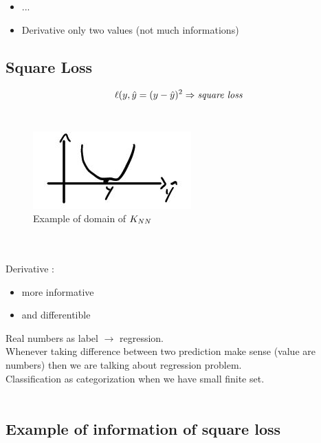 \documentclass[../main.tex]{subfiles}
\begin{document}
\begin{itemize}
\item ...
\item Derivative only two values (not much informations)
\end{itemize}

\subsection{Square Loss}
$$ \ell(y,\hat{y} = ( y - \hat{y} )^2  \Rightarrow \textit{square loss}\\$$
\\
\begin{figure}[h]
    \centering
    \includegraphics[width=0.4\linewidth]{../img/lez2-img2.JPG}
    \caption{Example of domain of $K_{NN}$}
\end{figure}\\
\\Derivative :
\begin{itemize}
\item more informative
\item and differentible 
\end{itemize}
Real numbers as label $\rightarrow$ regression.\\
Whenever taking difference between two prediction make sense (value are numbers) then we are talking about regression problem.\\
Classification as categorization when we have small finite set.\\\\

\subsection{Example of information of square loss}
\end{document}
